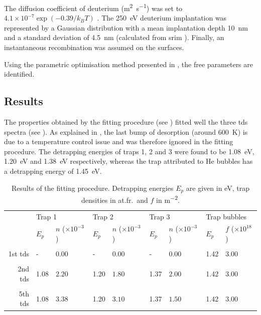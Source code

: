 The diffusion coefficient of deuterium (\si{m^2.s^{-1}}) was set to $4.1\times 10 ^{-7} \exp{(-0.39/k_B T)}$ .
The \SI{250}{eV} deuterium implantation was represented by a Gaussian distribution with a mean implantation depth \SI{10}{nm} and a standard deviation of \SI{4.5}{nm} (calculated from \gls{srim} ).
Finally, an instantaneous recombination was assumed on the surfaces.

Using the parametric optimisation method presented in , the free parameters are identified.

\subsection{Results}

The properties obtained by the fitting procedure (see ) fitted well the three \gls{tds} spectra (see ).
As explained in \cite{ialovega_hydrogen_2020}, the last bump of desorption (around \SI{600}{K}) is due to a temperature control issue and was therefore ignored in the fitting procedure.
The detrapping energies of traps 1, 2 and 3 were found to be \SI{1.08}{eV}, \SI{1.20}{eV} and \SI{1.38}{eV} respectively, whereas the trap attributed to \gls{He} bubbles has a detrapping energy of \SI{1.45}{eV}.


\begin{table}[!h]
    \caption{Results of the fitting procedure. Detrapping energies $E_p$ are given in \si{eV}, trap densities in \si{at.fr.} and $f$ in \si{m^{-2}}.}
    \begin{tabular}{r l l l l l l l l}
    \\
    &\multicolumn{2}{l}{Trap 1}  & \multicolumn{2}{l}{Trap 2} & \multicolumn{2}{l}{Trap 3} &\multicolumn{2}{l}{Trap bubbles} \\
     & $E_p$ & $n$ ($\times 10 ^{-3}$) & $E_p$ & $n$ ($\times 10 ^{-3}$) & $E_p$ & $n$ ($\times 10 ^{-3}$) & $E_p$ & $f$ ($\times 10 ^{18}$) \\
    \\
    1st \gls{tds} & - & 0.00 & - & 0.00 & - & 0.00 & 1.42 & $3.00$ \\
    \\
    2nd \gls{tds} & 1.08 & $2.20$ & 1.20 & $1.80$ & 1.37 & $2.00$ & 1.42 & $3.00$ \\
    \\
    5th \gls{tds} & 1.08 & $3.38$ & 1.20 & $3.10$ & 1.37 & $1.50$ & 1.42 & $3.00$ \\
    \end{tabular}
\end{table}

